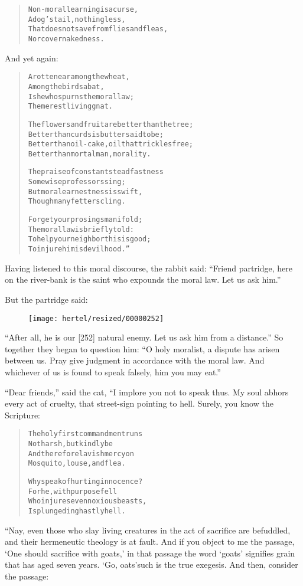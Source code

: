 \documentclass[article, twoside, 10pt]{memoir}
\renewenvironment{verbatim}{%
\begin{quote}%
\vskip -10pt%
\begin{alltt}\normalfont\small}{\end{alltt}%
\end{quote}%
\vskip -10pt
} %
\begin{document}
\begin{verbatim}
Non-moral learning is a curse,
    A dog's tail, nothing less,
That does not save from flies and fleas,
    Nor cover nakedness.
\end{verbatim}
And yet again:

\begin{verbatim}
A rotten ear among the wheat,
    Among the birds a bat,
Is he who spurns the moral law;
    The merest living gnat.

The flowers and fruit are better than the tree;
Better than curds is butter said to be;
Better than oil-cake, oil that trickles free;
Better than mortal man, morality.

The praise of constant steadfastness
    Some wise professors sing;
But moral earnestness is swift,
    Though many fetters cling.

Forget your prosings manifold;
The moral law is briefly told:
To help your neighbor{\textemdash}this is good;
To injure him is devilhood.”
\end{verbatim}
Having listened to this moral discourse, the rabbit said:
``Friend partridge, here on the river-bank is the saint who expounds the moral law. Let us ask him.''

But the partridge said:
\begin{figure}[p]\texttt{[image: hertel/resized/00000252]}\end{figure}``After all, he is our [252] natural enemy. Let us ask him from a distance.''
So together they began to question him:
``O holy moralist, a dispute has arisen between us. Pray give judgment in accordance with the moral law. And whichever of us is found to speak falsely, him you may eat.''

``Dear friends,'' said the cat, “I implore you not to speak thus.
My soul abhors every act of cruelty, that street-sign pointing to
hell. Surely, you know the Scripture:

\begin{verbatim}
The holy first commandment runs{\textemdash}
    Not harsh, but kindly be{\textemdash}
And therefore lavish mercy on
    Mosquito, louse, and flea.

Why speak of hurting innocence?
    For he, with purpose fell
Who injures even noxious beasts,
    Is plunged in ghastly hell.
\end{verbatim}
“Nay, even those who slay living creatures in the act of sacrifice
are befuddled, and their hermeneutic theology is at fault. And if
you object to me the passage, `One should sacrifice with goats,' in
that passage the word `goats' signifies grain that has aged seven
years. `Go, oats'{\textemdash}such is the true exegesis. And then, consider
the passage:
\end{document}
